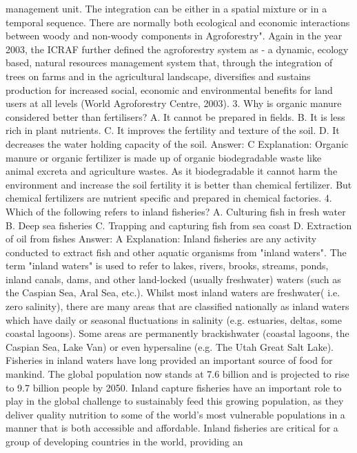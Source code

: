 management unit. The integration can be either in a spatial mixture
or in a temporal sequence. There are normally both ecological and
economic interactions between woody and non-woody components in
Agroforestry". Again in the year 2003, the ICRAF further defined
the agroforestry system as - a dynamic, ecology based, natural
resources management system that, through the integration of
trees on farms and in the agricultural landscape, diversifies and
sustains production for increased social, economic and environmental
benefits for land users at all levels (World Agroforestry Centre,
2003).
3. Why is organic manure considered better than fertilisers?
A. It cannot be prepared in fields.
B. It is less rich in plant nutrients.
C. It improves the fertility and texture of the soil.
D. It decreases the water holding capacity of the soil.
Answer: C
Explanation: Organic manure or organic fertilizer is made up of
organic biodegradable waste like animal excreta and
agriculture wastes. As it biodegradable it cannot harm the
environment and increase the soil fertility it is better than chemical
fertilizer. But chemical fertilizers are nutrient specific and
prepared in chemical factories.
4. Which of the following refers to inland fisheries?
A. Culturing fish in fresh water
B. Deep sea fisheries
C. Trapping and capturing fish from sea coast
D. Extraction of oil from fishes
Answer: A
Explanation: Inland fisheries are any activity conducted to extract
fish and other aquatic organisms from "inland waters".
The term "inland waters" is used to refer to lakes, rivers, brooks,
streams, ponds, inland canals, dams, and other land-locked (usually
freshwater) waters (such as the Caspian Sea, Aral Sea, etc.). Whilst
most inland waters are freshwater( i.e. zero salinity), there are
many areas that are classified nationally as inland waters which have
daily or seasonal fluctuations in salinity (e.g. estuaries, deltas, some
coastal lagoons). Some areas are permanently brackishwater (coastal
lagoons, the Caspian Sea, Lake Van) or even hypersaline (e.g. The
Utah Great Salt Lake).
Fisheries in inland waters have long provided an important source of
food for mankind. The global population now stands at 7.6 billion and
is projected to rise to 9.7 billion people by 2050. Inland capture
fisheries have an important role to play in the global challenge to
sustainably feed this growing population, as they deliver quality
nutrition to some of the world’s most vulnerable populations in a
manner that is both accessible and affordable. Inland fisheries are
critical for a group of developing countries in the world, providing an
